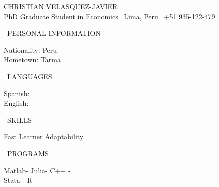 \documentclass[12pt, a4paper]{article}
\begin{document}
	\begin{center}
		\huge{CHRISTIAN VELASQUEZ-JAVIER}\\ \vskip5pt
		\small{PhD Graduate Student in Economics \quad \faMapMarker \, Lima, Peru \quad \faMobilePhone \, +51 935-122-479}
	\end{center}
\vspace{0.5cm}
\begin{minipage}[l]{0.19\linewidth}
\vspace{-6.5cm}
\footnotesize 
\begin{center} \faChild \, PERSONAL INFORMATION \faChild \end{center}
\vspace{-10pt}
	Nationality: Peru\\
	Hometown: Tarma\\
\begin{center}\faGlobe\, LANGUAGES \faGlobe \end{center}
\vspace{-10pt}
Spanish: \faStar\faStar\faStar\faStar\faStar  \\
English: \faStar\faStar\faStar\faStar\faStarHalfEmpty \\
\begin{center} \faThumbsUp  \, SKILLS  \faThumbsUp \end{center}
\vspace{-10pt}
\centering Fast Learner \quad  Adaptability \\
\begin{center} \faCode\, PROGRAMS \faCode \end{center}
\vspace{-10pt}
\centering Matlab- Julia- C++ - \\ Stata - R
\end{minipage}
\end{document}
